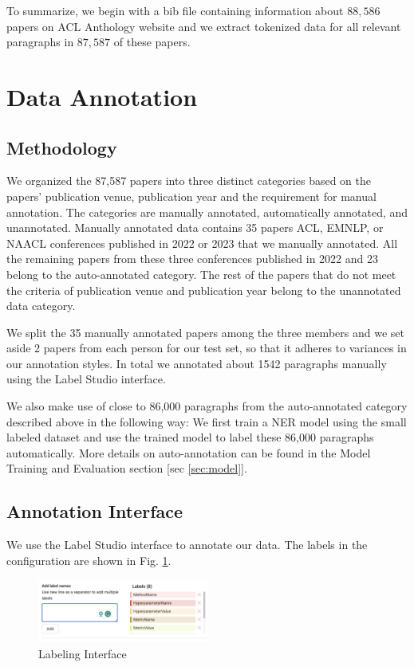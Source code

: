 \documentclass[11pt]{article}
\begin{document}
To summarize, we begin with a bib file containing information about $88,586$ papers on ACL Anthology website and we extract tokenized data for all relevant paragraphs in $87,587$ of these papers. 
\section{Data Annotation}\label{sec:data_annotation}
\subsection{Methodology}

We organized the 87,587 papers into three distinct categories based on the papers' publication venue, publication year and the requirement for manual annotation. The categories are manually annotated, automatically annotated, and unannotated. Manually annotated data contains 35 papers ACL, EMNLP, or NAACL conferences published in 2022 or 2023 that we manually annotated. All the remaining papers from these three conferences published in 2022 and 23 belong to the auto-annotated category. The rest of the papers that do not meet the criteria of publication venue and publication year belong to the unannotated data category.

We split the 35 manually annotated papers among the three members and we set aside 2 papers from each person for our test set, so that it adheres to variances in our annotation styles. In total we annotated about 1542 paragraphs manually using the Label Studio interface.

We also make use of close to 86,000 paragraphs from the auto-annotated category described above in the following way: We first train a NER model using the small labeled dataset and use the trained model to label these 86,000 paragraphs automatically. More details on auto-annotation can be found in the Model Training and Evaluation section [sec \ref{sec:model}]. 



\subsection{Annotation Interface}
We use the Label Studio interface to annotate our data. The labels in the configuration are shown in Fig. \ref{fig:interface}.
\begin{figure}[ht]
    \centering
    \includegraphics[width=0.5\textwidth]{images/interface.jpeg}
    \caption{Labeling Interface}
    \label{fig:interface}
\end{figure}
\end{document}
